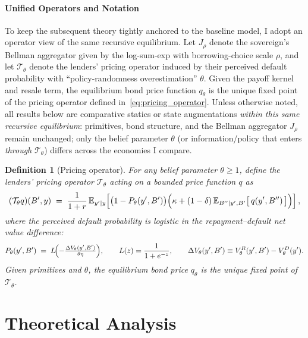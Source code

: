 \documentclass[12pt]{article}
\theoremstyle{plain}
\newtheorem{definition}{Definition}
\newcommand{\E}{\mathbb{E}}
\begin{document}

\paragraph{Unified Operators and Notation}
To keep the subsequent theory tightly anchored to the baseline model, I adopt
an operator view of the same recursive equilibrium. Let $J_\rho$ denote the
sovereign's Bellman aggregator given by the log-sum-exp with borrowing-choice
scale $\rho$, and let $\mathcal T_\theta$ denote the lenders' pricing operator
induced by their perceived default probability with ``policy-randomness
overestimation'' $\theta$. Given the payoff kernel and resale term, the
equilibrium bond price function $q_\theta$ is the unique fixed point of the
pricing operator defined in~\eqref{eq:pricing_operator}. Unless otherwise
noted, all results below are comparative statics or state augmentations
\emph{within this same recursive equilibrium}: primitives, bond structure, and
the Bellman aggregator $J_\rho$ remain unchanged; only the belief parameter
$\theta$ (or information/policy that enters \emph{through} $\mathcal T_\theta$)
differs across the economies I compare.

\begin{definition}[Pricing operator]
	\label{def:pricing_operator}
	For any belief parameter $\theta \ge 1$, define the lenders' pricing operator $\mathcal T_\theta$ acting on a bounded price function $q$ as
	\begin{equation}
		(\mathcal T_\theta q)(B',y)
		\;=\; \frac{1}{1+r}\,\E_{y'|y}\!\left[\bigl(1-P_\theta(y',B')\bigr)\Bigl(\kappa+(1-\delta)\,\E_{B''|y',B'}\big[\,q(y',B'')\,\big]\Bigr)\right],
		\label{eq:pricing_operator}
	\end{equation}
	where the perceived default probability is logistic in the repayment--default net value difference:
	\begin{equation}
		P_\theta(y',B') \;=\; L\!\Bigl(-\tfrac{\Delta V_\theta(y',B')}{\theta\eta}\Bigr),\qquad
		L(z)=\frac{1}{1+e^{-z}},\qquad
		\Delta V_\theta(y',B')\equiv V_\theta^R(y',B')-V_\theta^D(y').
		\label{eq:net_value_definition}
	\end{equation}
	Given primitives and $\theta$, the equilibrium bond price $q_\theta$ is the unique fixed point of $\mathcal T_\theta$.
\end{definition}

\section{Theoretical Analysis}
\label{sec:theory}
\end{document}
